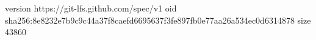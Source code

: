 version https://git-lfs.github.com/spec/v1
oid sha256:8e8232e7b9c9c44a37f8caefd6695637f3fe897fb0e77aa26a534ec0d6314878
size 43860

